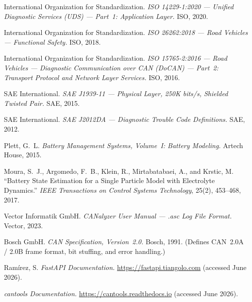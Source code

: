 \documentclass[12pt, a4paper, openany]{report}
\begin{document}
\begin{center}
\begin{enumerate}[leftmargin=2em, label={[\arabic*]}, itemsep=4pt]

  \item International Organization for Standardization.
    \textit{ISO 14229-1:2020 --- Unified Diagnostic Services (UDS) ---
    Part~1: Application Layer.} ISO, 2020.

  \item International Organization for Standardization.
    \textit{ISO 26262:2018 --- Road Vehicles --- Functional Safety.}
    ISO, 2018.

  \item International Organization for Standardization.
    \textit{ISO 15765-2:2016 --- Road Vehicles --- Diagnostic Communication
    over CAN (DoCAN) --- Part~2: Transport Protocol and Network Layer
    Services.} ISO, 2016.

  \item SAE International.
    \textit{SAE J1939-11 --- Physical Layer, 250K bits/s, Shielded Twisted
    Pair.} SAE, 2015.

  \item SAE International.
    \textit{SAE J2012DA --- Diagnostic Trouble Code Definitions.}
    SAE, 2012.

  \item Plett, G.~L.
    \textit{Battery Management Systems, Volume~I: Battery Modeling.}
    Artech House, 2015.

  \item Moura, S.~J., Argomedo, F.~B., Klein, R., Mirtabatabaei, A.,
    and Krstic, M.
    ``Battery State Estimation for a Single Particle Model with
    Electrolyte Dynamics.''
    \textit{IEEE Transactions on Control Systems Technology}, 25(2),
    453--468, 2017.

  \item Vector Informatik GmbH.
    \textit{CANalyzer User Manual --- .asc Log File Format.}
    Vector, 2023.

  \item Bosch GmbH.
    \textit{CAN Specification, Version~2.0.} Bosch, 1991.
    (Defines CAN~2.0A / 2.0B frame format, bit stuffing, and error
    handling.)

  \item Ramírez, S. \textit{FastAPI Documentation.}
    \url{https://fastapi.tiangolo.com} (accessed June 2026).

  \item \textit{cantools Documentation.}
    \url{https://cantools.readthedocs.io} (accessed June 2026).


\end{enumerate}
\end{center}
\end{document}
